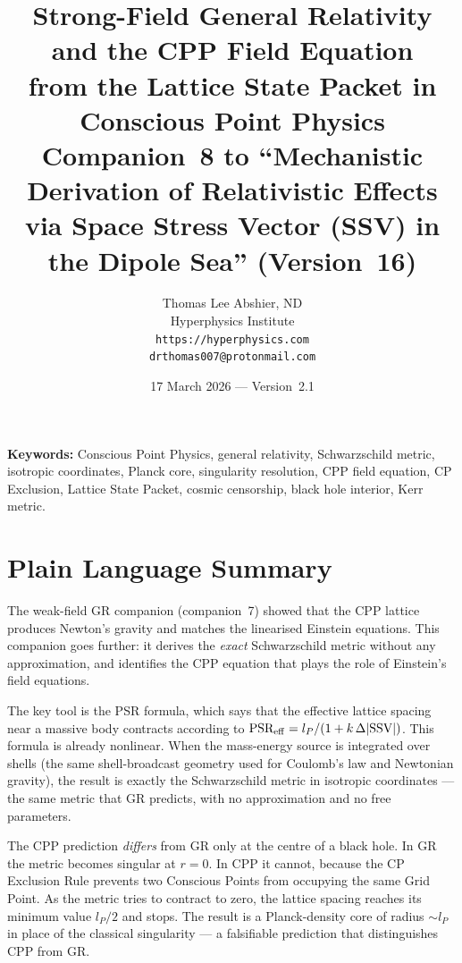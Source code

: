 \documentclass[12pt]{article}
\title{\textbf{Strong-Field General Relativity and the CPP Field Equation\\
from the Lattice State Packet in Conscious Point Physics}\\[6pt]
{\large Companion~8 to ``Mechanistic Derivation of Relativistic Effects\\
via Space Stress Vector (SSV) in the Dipole Sea'' (Version~16)}}
\author{Thomas Lee Abshier, ND\\
Hyperphysics Institute\\
\texttt{https://hyperphysics.com}\\
\texttt{drthomas007@protonmail.com}}
\date{17 March 2026 --- Version~2.1}
\newcommand{\lP}{l_P}
\newcommand{\SSV}{\text{SSV}}
\newcommand{\PSR}{\text{PSR}}
\begin{document}
\maketitle

\noindent\textbf{Keywords:} Conscious Point Physics, general relativity,
Schwarzschild metric, isotropic coordinates, Planck core, singularity
resolution, CPP field equation, CP Exclusion, Lattice State Packet,
cosmic censorship, black hole interior, Kerr metric.

\section*{Plain Language Summary}

The weak-field GR companion (companion~7) showed that the CPP lattice
produces Newton's gravity and matches the linearised Einstein equations.
This companion goes further: it derives the \emph{exact} Schwarzschild
metric without any approximation, and identifies the CPP equation that
plays the role of Einstein's field equations.

The key tool is the PSR formula, which says that the effective lattice
spacing near a massive body contracts according to
$\PSR_{\rm eff} = \lP/(1 + k\,\Delta|\SSV|)$.  This formula is already
nonlinear.  When the mass-energy source is integrated over shells
(the same shell-broadcast geometry used for Coulomb's law and Newtonian
gravity), the result is exactly the Schwarzschild metric in isotropic
coordinates --- the same metric that GR predicts, with no approximation
and no free parameters.

The CPP prediction \emph{differs} from GR only at the centre of a black
hole.  In GR the metric becomes singular at $r = 0$.  In CPP it cannot,
because the CP Exclusion Rule prevents two Conscious Points from
occupying the same Grid Point.  As the metric tries to contract to zero,
the lattice spacing reaches its minimum value $\lP/2$ and stops.
The result is a Planck-density core of radius $\sim\lP$ in place of
the classical singularity --- a falsifiable prediction that distinguishes
CPP from GR.
\end{document}
